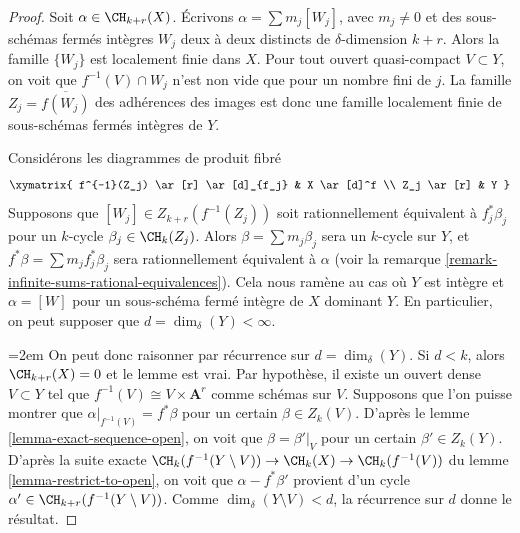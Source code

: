 \begin{proof}
Soit $\alpha \in \CH_{k + r}(X)$.
Écrivons $\alpha = \sum m_j[W_j]$, avec $m_j \not = 0$ et
des sous-schémas fermés intègres $W_j$ deux à deux distincts de
$\delta$-dimension $k + r$. Alors la famille $\{W_j\}$
est localement finie dans $X$. Pour tout ouvert quasi-compact
$V \subset Y$, on voit que $f^{-1}(V) \cap W_j$
n'est non vide que pour un nombre fini de $j$. La
famille $Z_j = \overline{f(W_j)}$ des adhérences
des images est donc une famille localement finie de sous-schémas
fermés intègres de $Y$.

\medskip\noindent
Considérons les diagrammes de produit fibré
$$
\xymatrix{
f^{-1}(Z_j) \ar[r] \ar[d]_{f_j} & X \ar[d]^f \\
Z_j \ar[r] & Y
}
$$
Supposons que $[W_j] \in Z_{k + r}(f^{-1}(Z_j))$
soit rationnellement équivalent à $f_j^*\beta_j$ pour un
$k$-cycle $\beta_j \in \CH_k(Z_j)$. Alors
$\beta = \sum m_j \beta_j$ sera un $k$-cycle sur $Y$,
et $f^*\beta = \sum m_j f_j^*\beta_j$ sera rationnellement
équivalent à $\alpha$ (voir la
remarque \ref{remark-infinite-sums-rational-equivalences}).
Cela nous ramène au cas où $Y$ est intègre et
$\alpha = [W]$ pour un sous-schéma fermé intègre
de $X$ dominant $Y$. En particulier, on peut
supposer que $d = \dim_\delta(Y) < \infty$.

{\emergencystretch=2em\medskip\noindent
On peut donc raisonner par récurrence sur $d = \dim_\delta(Y)$.
Si $d < k$, alors $\CH_{k + r}(X) = 0$ et le lemme est vrai.
Par hypothèse, il existe un ouvert dense $V \subset Y$ tel
que $f^{-1}(V) \cong V \times \mathbf{A}^r$ comme schémas sur $V$.
Supposons que l'on puisse montrer que $\alpha|_{f^{-1}(V)} = f^*\beta$
pour un certain $\beta \in Z_k(V)$. D'après le lemme \ref{lemma-exact-sequence-open},
on voit que
$\beta = \beta'|_V$ pour un certain $\beta' \in Z_k(Y)$.
D'après la suite exacte
$\CH_k(f^{-1}(Y \setminus V)) \to \CH_k(X) \to \CH_k(f^{-1}(V))$
du lemme \ref{lemma-restrict-to-open},
on voit que $\alpha - f^*\beta'$ provient
d'un cycle $\alpha' \in \CH_{k + r}(f^{-1}(Y \setminus V))$.
Comme $\dim_\delta(Y \setminus V) < d$, la récurrence sur
$d$ donne le résultat.\par}


\end{proof}
